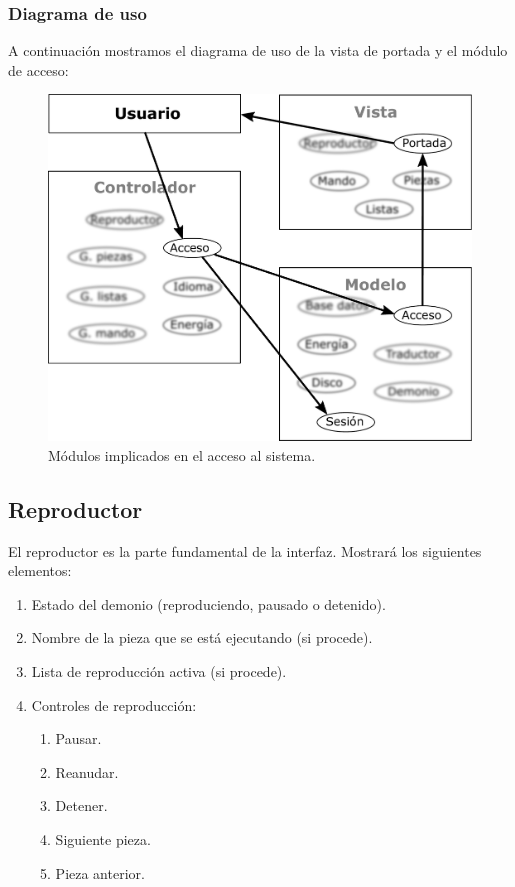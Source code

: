 \subsubsection{Diagrama de uso}

A continuación mostramos el diagrama de uso de la vista de portada y el módulo de acceso:

\smallskip

\begin{figure}[H]
	\noindent \begin{centering}
		\includegraphics[width=\linewidth/2]{capitulo4/mvc_acceso}
		\par\end{centering}
	\smallskip
	\caption{\label{fig:mvc_acceso} Módulos implicados en el acceso al sistema.}
\end{figure} 

\smallskip

\subsection{Reproductor}

El reproductor es la parte fundamental de la interfaz. Mostrará los siguientes elementos:

\begin{enumerate}
	\item Estado del demonio (reproduciendo, pausado o detenido).
	\item Nombre de la pieza que se está ejecutando (si procede).
	\item Lista de reproducción activa (si procede).
	\item Controles de reproducción:
	
	\begin{enumerate}
		\item Pausar.
		\item Reanudar.
		\item Detener.
		\item Siguiente pieza.
		\item Pieza anterior.
	\end{enumerate}
\end{enumerate}

